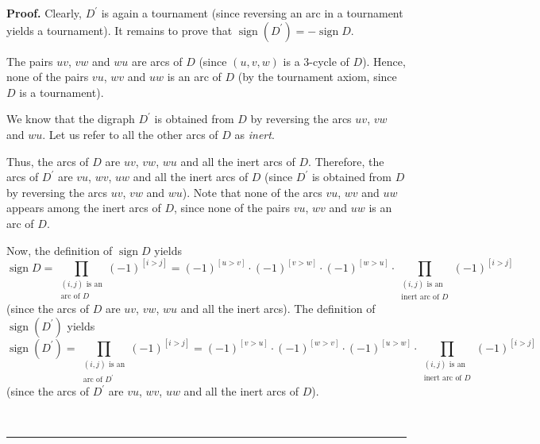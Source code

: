 \documentclass[numbers=enddot,12pt,final,onecolumn,notitlepage]{scrartcl}%
\numberwithin{exer}{subsection}
\theoremstyle{definition}
\newenvironment{proof}[1][Proof]{\noindent\textbf{#1.} }{\ \rule{0.5em}{0.5em}}
\let\prodnonlimits\prod
\renewcommand{\prod}{\prodnonlimits\limits}
\begin{document}
\begin{proof}
Clearly, $D^{\prime}$ is again a tournament (since reversing an arc in a
tournament yields a tournament). It remains to prove that
$\operatorname*{sign}\left(  D^{\prime}\right)  =-\operatorname*{sign}D$.

The pairs $uv$, $vw$ and $wu$ are arcs of $D$ (since $\left(  u,v,w\right)  $
is a $3$-cycle of $D$). Hence, none of the pairs $vu$, $wv$ and $uw$ is an arc
of $D$ (by the tournament axiom, since $D$ is a tournament).

We know that the digraph $D^{\prime}$ is obtained from $D$ by reversing the
arcs $uv$, $vw$ and $wu$. Let us refer to all the other arcs of $D$ as
\emph{inert}.

Thus, the arcs of $D$ are $uv$, $vw$, $wu$ and all the inert arcs of $D$.
Therefore, the arcs of $D^{\prime}$ are $vu$, $wv$, $uw$ and all the inert
arcs of $D$ (since $D^{\prime}$ is obtained from $D$ by reversing the arcs
$uv$, $vw$ and $wu$). Note that none of the arcs $vu$, $wv$ and $uw$ appears
among the inert arcs of $D$, since none of the pairs $vu$, $wv$ and $uw$ is an
arc of $D$.

Now, the definition of $\operatorname*{sign}D$ yields%
\[
\operatorname*{sign}D=\prod_{\substack{\left(  i,j\right)  \text{ is
an}\\\text{arc of }D}}\left(  -1\right)  ^{\left[  i>j\right]  }=\left(
-1\right)  ^{\left[  u>v\right]  }\cdot\left(  -1\right)  ^{\left[
v>w\right]  }\cdot\left(  -1\right)  ^{\left[  w>u\right]  }\cdot
\prod_{\substack{\left(  i,j\right)  \text{ is an}\\\text{inert arc of }%
D}}\left(  -1\right)  ^{\left[  i>j\right]  }%
\]
(since the arcs of $D$ are $uv$, $vw$, $wu$ and all the inert arcs). The
definition of $\operatorname*{sign}\left(  D^{\prime}\right)  $ yields
\[
\operatorname*{sign}\left(  D^{\prime}\right)  =\prod_{\substack{\left(
i,j\right)  \text{ is an}\\\text{arc of }D^{\prime}}}\left(  -1\right)
^{\left[  i>j\right]  }=\left(  -1\right)  ^{\left[  v>u\right]  }\cdot\left(
-1\right)  ^{\left[  w>v\right]  }\cdot\left(  -1\right)  ^{\left[
u>w\right]  }\cdot\prod_{\substack{\left(  i,j\right)  \text{ is
an}\\\text{inert arc of }D}}\left(  -1\right)  ^{\left[  i>j\right]  }%
\]
(since the arcs of $D^{\prime}$ are $vu$, $wv$, $uw$ and all the inert arcs of
$D$).


\end{proof}
\end{document}
